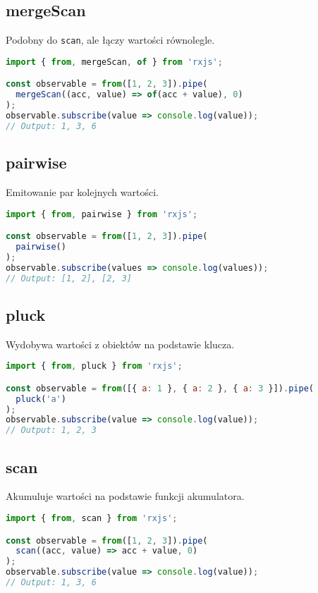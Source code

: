 \documentclass[a4paper,12pt]{article}
\begin{document}
\subsection{mergeScan}
Podobny do \texttt{scan}, ale łączy wartości równolegle.

\begin{lstlisting}[language=JavaScript, caption=Przykład użycia \texttt{mergeScan}]
import { from, mergeScan, of } from 'rxjs';

const observable = from([1, 2, 3]).pipe(
  mergeScan((acc, value) => of(acc + value), 0)
);
observable.subscribe(value => console.log(value));
// Output: 1, 3, 6
\end{lstlisting}

\subsection{pairwise}
Emitowanie par kolejnych wartości.

\begin{lstlisting}[language=JavaScript, caption=Przykład użycia \texttt{pairwise}]
import { from, pairwise } from 'rxjs';

const observable = from([1, 2, 3]).pipe(
  pairwise()
);
observable.subscribe(values => console.log(values));
// Output: [1, 2], [2, 3]
\end{lstlisting}

\subsection{pluck}
Wydobywa wartości z obiektów na podstawie klucza.

\begin{lstlisting}[language=JavaScript, caption=Przykład użycia \texttt{pluck}]
import { from, pluck } from 'rxjs';

const observable = from([{ a: 1 }, { a: 2 }, { a: 3 }]).pipe(
  pluck('a')
);
observable.subscribe(value => console.log(value));
// Output: 1, 2, 3
\end{lstlisting}

\subsection{scan}
Akumuluje wartości na podstawie funkcji akumulatora.

\begin{lstlisting}[language=JavaScript, caption=Przykład użycia \texttt{scan}]
import { from, scan } from 'rxjs';

const observable = from([1, 2, 3]).pipe(
  scan((acc, value) => acc + value, 0)
);
observable.subscribe(value => console.log(value));
// Output: 1, 3, 6
\end{lstlisting}
\end{document}
